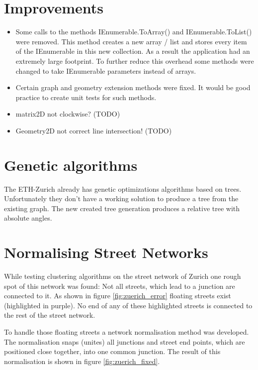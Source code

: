 \documentclass[11pt, a4paper]{report}
\begin{document}
\section{Improvements}
\begin{itemize}
    \item Some calls to the methods IEnumerable.ToArray() and IEnumerable.ToList() were removed. This method creates a new array / list and stores every item of the IEnumerable in this new collection. As a result the application had an extremely large footprint. To further reduce this overhead some methods were changed to take IEnumerable parameters instead of arrays.
    \item Certain graph and geometry extension methods were fixed. It would be good practice to create unit tests for such methods.
    \item matrix2D not clockwise? (TODO)
    \item Geometry2D not correct line intersection! (TODO)
\end{itemize}

\section{Genetic algorithms}
The ETH-Zurich already has genetic optimizations algorithms based on trees. Unfortunately they don't have a working solution to produce a tree from the existing graph. The new created tree generation produces a relative tree with absolute angles.

\pagebreak
\section{Normalising Street Networks}
While testing clustering algorithms on the street network of Zurich one rough spot of this network was found: Not all streets, which lead to a junction are connected to it. As shown in figure \ref{fig:zuerich_error} floating streets exist (highlighted in purple). No end of any of these highlighted streets is connected to the rest of the street network.

To handle those floating streets a network normalisation method was developed. The normalisation snaps (unites) all junctions and street end points, which are positioned close together, into one common junction. The result of this normalisation is shown in figure \ref{fig:zuerich_fixed}.
\end{document}
